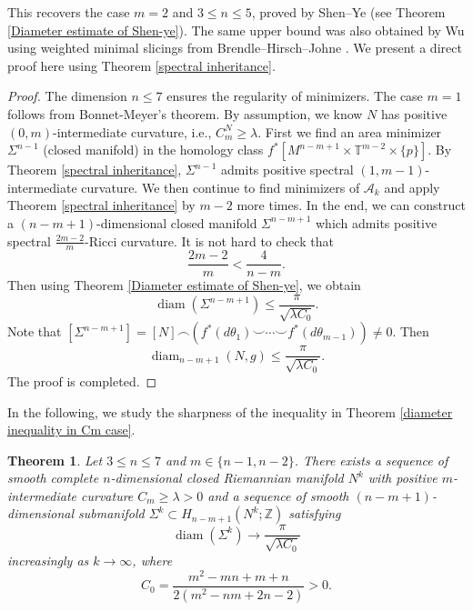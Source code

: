 \documentclass[11pt,letterpaper]{amsart}
\newtheorem{theorem}{Theorem}[section]
\theoremstyle{definition}
\theoremstyle{remark}
\numberwithin{equation}{section}
\begin{document}
This recovers the case $m=2$ and $3\leq n\leq 5$, proved by Shen–Ye \cite{shenyingyerugang} (see Theorem \ref{Diameter estimate of Shen-ye}). The same upper bound was also obtained by Wu \cite[Theorem 1.5]{wuyujie-diameter-estimate} using weighted minimal slicings from Brendle–Hirsch–Johne \cite{brendlegeroch'sconjecture}. We present a direct proof here using Theorem \ref{spectral inheritance}.
\begin{proof}
    The dimension $n\leq 7$ ensures the regularity of minimizers. The case $m=1$ follows from Bonnet-Meyer's theorem. By assumption, we know $N$ has positive $(0,m)$-intermediate curvature, i.e., $C_m^N\geq\lambda.$ First we find an area minimizer $\Sigma^{n-1}$ (closed manifold) in the homology class $f^{*}[M^{n-m+1}\times \mathbb{T}^{m-2}\times \{p\}]$. By Theorem \ref{spectral inheritance}, $\Sigma^{n-1}$ admits positive spectral $(1,m-1)$-intermediate curvature. We then continue to find minimizers of $\mathcal{A}_k$ and apply Theorem \ref{spectral inheritance} by $m-2$ more times. In the end, we can construct a $(n-m+1)$-dimensional closed manifold $\Sigma^{n-m+1}$ which admits positive spectral $\frac{2m-2}{m}$-Ricci curvature.  It is not hard to check that 
    \begin{equation}\label{condition 1}
        \frac{2m-2}{m}< \frac{4}{n-m}.
    \end{equation}
    Then using Theorem \ref{Diameter estimate of Shen-ye}, we obtain 
    \[
    \operatorname{diam}(\Sigma^{n-m+1})\leq \frac{\pi}{\sqrt{\lambda C_{0}}}.
    \]
    Note that $[\Sigma^{n-m+1}]=[N]\frown (f^*(d\theta_{1})\smile\cdots \smile f^{*}(d\theta_{m-1}))\neq 0$. Then
    \[
    \operatorname{diam}_{n-m+1}(N,g)\leq \frac{\pi}{\sqrt{\lambda C_{0}}}.
    \]
    The proof is completed.
\end{proof}

In the following, we study the sharpness of the inequality in Theorem \ref{diameter inequality in Cm case}.


\begin{theorem}\label{example sharp diameter of C_m}
Let $3\leq n\leq 7$ and $m\in\{n-1,n-2\}$. There exists a sequence of smooth complete $n$-dimensional closed Riemannian manifold $N^{k}$ with positive $m$-intermediate curvature $C_{m}\geq \lambda>0$ and a sequence of smooth $(n-m+1)$-dimensional submanifold $\Sigma^{k}\subset H_{n-m+1}(N^{k};\mathbb{Z})$ satisfying $$\operatorname{diam}(\Sigma^{k})\rightarrow \frac{\pi}{\sqrt{\lambda C_{0}}}$$ increasingly as $k\rightarrow \infty$, where
\[
C_{0}=\frac{m^2-mn+m+n}{2(m^2-nm+2n-2)}>0.
\]
\end{theorem}
\end{document}
